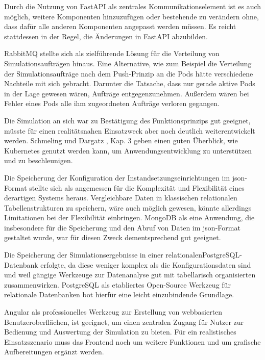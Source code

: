\documentclass[11pt,a4paper]{article}
\begin{document}
Durch die Nutzung von FastAPI als zentrales Kommunikationselement ist es auch möglich, weitere Komponenten hinzuzufügen
oder bestehende zu verändern ohne, dass dafür alle anderen Komponenten angepasst werden müssen.
Es reicht stattdessen in der Regel, die Änderungen in FastAPI abzubilden.

RabbitMQ stellte sich als zielführende Lösung für die Verteilung von Simulationsaufträgen hinaus.
Eine Alternative, wie zum Beispiel die Verteilung der Simulationsaufträge nach dem Push-Prinzip an die Pods
hätte verschiedene Nachteile mit sich gebracht. Darunter die Tatsache, dass nur gerade aktive Pods
in der Lage gewesen wären, Aufträge entgegenzunehmen. Außerdem wären bei Fehler eines Pods alle
ihm zugeordneten Aufträge verloren gegangen.

Die Simulation an sich war zu Bestätigung des Funktionsprinzips gut geeignet,
müsste für einen realitätsnahen Einsatzweck aber noch deutlich weiterentwickelt werden.
Schmeling und Dargatz \cite{Schmeling_Dargatz_2022}, Kap. 3 geben einen guten Überblick,
wie Kubernetes genutzt werden kann, um Anwendungsentwicklung zu unterstützen und zu beschleunigen.

Die Speicherung der Konfiguration der Instandsetzungseinrichtungen im json-Format stellte sich als 
angemessen für die Komplexität und Flexibilität eines derartigen Systems heraus. 
Vergleichbare Daten in klassischen relationalen Tabellenstrukturen zu speichern, wäre auch
möglich gewesen, könnte allerdings Limitationen bei der Flexibilität einbringen.
MongoDB als eine Anwendung, die insbesondere für die Speicherung und den Abruf von
Daten im json-Format gestaltet wurde, war für diesen Zweck dementsprechend gut geeignet.

Die Speicherung der Simulationsergebnisse in einer relationalen\linebreak PostgreSQL-Datenbank
erfolgte, da diese weniger komplex als die Konfigurationsdaten sind und weil
gängige Werkzeuge zur Datenanalyse gut mit tabellarisch organisierten zusammenwirken.
PostgreSQL als etabliertes Open-Source Werkzeug für relationale Datenbanken bot
hierfür eine leicht einzubindende Grundlage.

Angular als professionelles Werkzeug zur Erstellung von webbasierten Benutzeroberflächen,
ist geeignet, um einen zentralen Zugang für Nutzer zur Bedienung und Auswertung der Simulation zu bieten.
Für ein realistisches Einsatzszenario muss das Frontend noch um weitere Funktionen
und um grafische Aufbereitungen ergänzt werden.
\end{document}
